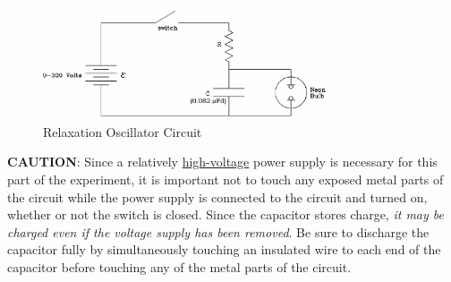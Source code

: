 \begin{figure}[h]
   \begin{center}
       \includegraphics[width=0.75\textwidth]{./Exp3/pic/image8.png}
   \end{center}
   \caption{Relaxation Oscillator Circuit}
   \label{fig:relaxcirc}
\end{figure}

\textbf{CAUTION}: Since a relatively \underline{high-voltage} power supply is necessary for this part of the experiment, it is important not to touch any exposed metal parts of the circuit while the power supply is connected to the circuit and turned on, whether or not the switch is closed. Since the capacitor stores charge, \emph{it may be charged even if the voltage supply has been removed}. Be sure to discharge the capacitor fully by simultaneously touching an insulated wire to each end of the capacitor before touching any of the metal parts of the circuit.\myskip


